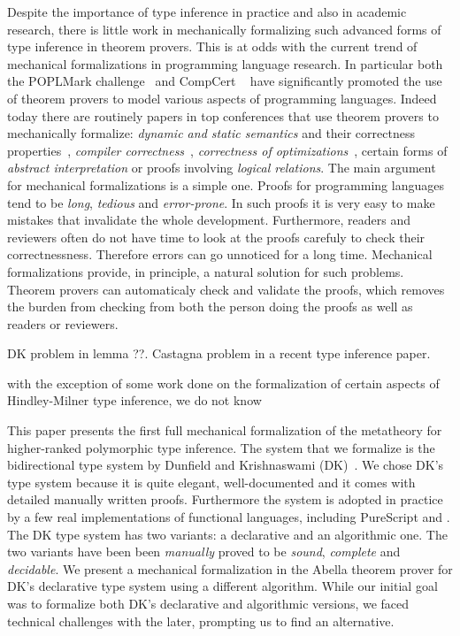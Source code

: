 Despite the importance of type inference in practice and also in
academic research, there is little work in mechanically formalizing
such advanced forms of type inference in theorem provers. This is at
odds with the current trend of mechanical formalizations in
programming language research. In particular both the POPLMark
challenge~\cite{} and CompCert ~\cite{} have significantly promoted
the use of theorem provers to model various aspects of programming
languages. Indeed today there are routinely papers in top conferences
that use theorem provers to mechanically formalize: \emph{dynamic and
  static semantics} and their correctness properties~\cite{},
\emph{compiler correctness}~\cite{}, \emph{correctness of
  optimizations}~\cite{}, certain forms of \emph{abstract
  interpretation} or proofs involving \emph{logical relations}. The
main argument for mechanical formalizations is a simple one. Proofs
for programming languages tend to be \emph{long}, \emph{tedious} and
\emph{error-prone}. In such proofs it is very easy to make mistakes
that invalidate the whole development. Furthermore, readers and
reviewers often do not have time to look at the proofs carefuly to
check their correctnessness. Therefore errors can go unnoticed for a
long time.  Mechanical formalizations provide, in principle, a natural
solution for such problems. Theorem provers can automaticaly check and
validate the proofs, which removes the burden from checking from both
the person doing the proofs as well as readers or reviewers.

DK problem in lemma ??. Castagna problem in a recent type inference paper.

with the exception of some work
done on the formalization of 
certain aspects of Hindley-Milner type inference, we do not know 

This paper presents the first full mechanical formalization of the
metatheory for higher-ranked polymorphic type inference.
The system
that we formalize is the bidirectional type system by Dunfield and
Krishnaswami (DK)~\cite{}. We chose DK's type system because it is
quite elegant, well-documented and it comes with detailed manually
written proofs. Furthermore the system is adopted in practice by a few
real implementations of functional languages, including PureScript and
.  The DK type system has two variants: a declarative
and an algorithmic one. The two variants have been been
\emph{manually} proved to be \emph{sound}, \emph{complete} and
\emph{decidable}.
We present a mechanical formalization in the Abella theorem prover for
DK's declarative type system using a different algorithm. While our
initial goal was to formalize both DK's declarative and algorithmic
versions, we faced technical challenges with the later, prompting us to find
an alternative.

